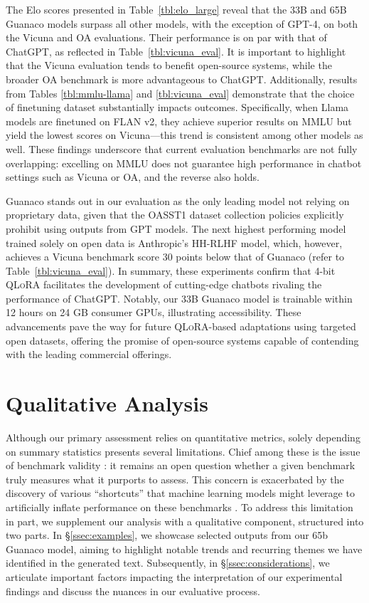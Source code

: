 The Elo scores presented in Table~\ref{tbl:elo_large} reveal that the 33B and 65B {Guanaco} models surpass all other models, with the exception of GPT-4, on both the Vicuna and OA evaluations. Their performance is on par with that of ChatGPT, as reflected in Table~\ref{tbl:vicuna_eval}. It is important to highlight that the Vicuna evaluation tends to benefit open-source systems, while the broader OA benchmark is more advantageous to ChatGPT. Additionally, results from Tables \ref{tbl:mmlu-llama} and \ref{tbl:vicuna_eval} demonstrate that the choice of finetuning dataset substantially impacts outcomes. Specifically, when Llama models are finetuned on FLAN v2, they achieve superior results on MMLU but yield the lowest scores on Vicuna—this trend is consistent among other models as well. These findings underscore that current evaluation benchmarks are not fully overlapping: excelling on MMLU does not guarantee high performance in chatbot settings such as Vicuna or OA, and the reverse also holds. 

{Guanaco} stands out in our evaluation as the only leading model not relying on proprietary data, given that the OASST1 dataset collection policies explicitly prohibit using outputs from GPT models. The next highest performing model trained solely on open data is Anthropic's HH-RLHF model, which, however, achieves a Vicuna benchmark score 30 points below that of {Guanaco} (refer to Table~\ref{tbl:vicuna_eval}). In summary, these experiments confirm that 4-bit \textsc{QLoRA} facilitates the development of cutting-edge chatbots rivaling the performance of ChatGPT. Notably, our 33B {Guanaco} model is trainable within 12 hours on 24 GB consumer GPUs, illustrating accessibility. These advancements pave the way for future \textsc{QLoRA}-based adaptations using targeted open datasets, offering the promise of open-source systems capable of contending with the leading commercial offerings.

\section{Qualitative Analysis}

Although our primary assessment relies on quantitative metrics, solely depending on summary statistics presents several limitations. Chief among these is the issue of benchmark validity \citep{liao2021we}: it remains an open question whether a given benchmark truly measures what it purports to assess. This concern is exacerbated by the discovery of various ``shortcuts'' that machine learning models might leverage to artificially inflate performance on these benchmarks \citep{gururangan2018annotation, poliak2018hypothesis}. To address this limitation in part, we supplement our analysis with a qualitative component, structured into two parts. In \S\ref{ssec:examples}, we showcase selected outputs from our 65b {Guanaco} model, aiming to highlight notable trends and recurring themes we have identified in the generated text. Subsequently, in \S\ref{ssec:considerations}, we articulate important factors impacting the interpretation of our experimental findings and discuss the nuances in our evaluative process.

